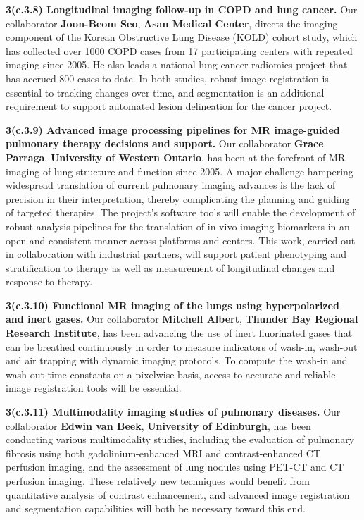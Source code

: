 \documentclass[11pt,]{article}
\begin{document}
\textbf{3(c.3.8) Longitudinal imaging follow-up in COPD and lung
cancer.} Our collaborator \textbf{Joon-Beom Seo}, \textbf{Asan Medical
Center}, directs the imaging component of the Korean Obstructive Lung
Disease (KOLD) cohort study, which has collected over 1000 COPD cases
from 17 participating centers with repeated imaging since 2005. He also
leads a national lung cancer radiomics project that has accrued 800
cases to date. In both studies, robust image registration is essential
to tracking changes over time, and segmentation is an additional
requirement to support automated lesion delineation for the cancer
project.

\textbf{3(c.3.9) Advanced image processing pipelines for MR image-guided
pulmonary therapy decisions and support.} Our collaborator \textbf{Grace
Parraga}, \textbf{University of Western Ontario}, has been at the
forefront of MR imaging of lung structure and function since 2005. A
major challenge hampering widespread translation of current pulmonary
imaging advances is the lack of precision in their interpretation,
thereby complicating the planning and guiding of targeted therapies. The
project's software tools will enable the development of robust analysis
pipelines for the translation of in vivo imaging biomarkers in an open
and consistent manner across platforms and centers. This work, carried
out in collaboration with industrial partners, will support patient
phenotyping and stratification to therapy as well as measurement of
longitudinal changes and response to therapy.

\textbf{3(c.3.10) Functional MR imaging of the lungs using
hyperpolarized and inert gases.} Our collaborator \textbf{Mitchell
Albert}, \textbf{Thunder Bay Regional Research Institute}, has been
advancing the use of inert fluorinated gases that can be breathed
continuously in order to measure indicators of wash-in, wash-out and air
trapping with dynamic imaging protocols. To compute the wash-in and
wash-out time constants on a pixelwise basis, access to accurate and
reliable image registration tools will be essential.

\textbf{3(c.3.11) Multimodality imaging studies of pulmonary diseases.}
Our collaborator \textbf{Edwin van Beek}, \textbf{University of
Edinburgh}, has been conducting various multimodality studies, including
the evaluation of pulmonary fibrosis using both gadolinium-enhanced MRI
and contrast-enhanced CT perfusion imaging, and the assessment of lung
nodules using PET-CT and CT perfusion imaging. These relatively new
techniques would benefit from quantitative analysis of contrast
enhancement, and advanced image registration and segmentation
capabilities will both be necessary toward this end.
\end{document}
